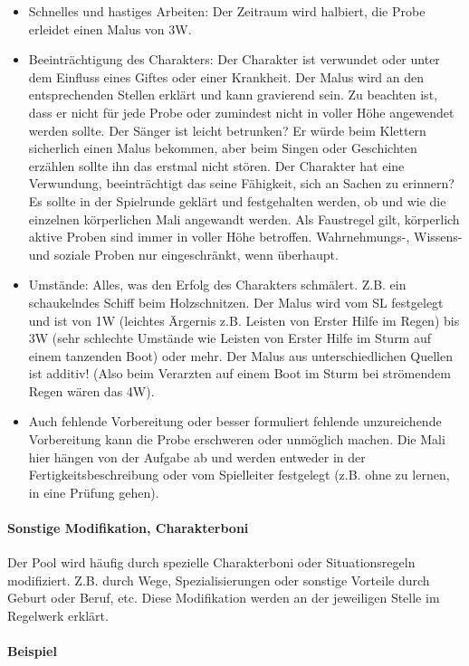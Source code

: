 \documentclass{article}
\begin{document}
\begin{itemize}
\item Schnelles und hastiges Arbeiten: Der Zeitraum wird halbiert, die Probe erleidet einen Malus von 3W.
\item Beeinträchtigung des Charakters: Der Charakter ist verwundet oder unter dem Einfluss eines Giftes oder einer Krankheit. Der Malus wird an den entsprechenden Stellen erklärt und kann gravierend sein. Zu beachten ist, dass er nicht für jede Probe oder zumindest nicht in voller Höhe angewendet werden sollte. Der Sänger ist leicht betrunken? Er würde beim Klettern sicherlich einen Malus bekommen, aber beim Singen oder Geschichten erzählen sollte ihn das erstmal nicht stören.  Der Charakter hat eine Verwundung, beeinträchtigt das seine Fähigkeit, sich an Sachen zu erinnern? Es sollte in der Spielrunde geklärt und festgehalten werden, ob und wie die einzelnen körperlichen Mali angewandt werden. Als Faustregel gilt, körperlich aktive Proben sind immer in voller Höhe betroffen. Wahrnehmungs-, Wissens- und soziale Proben nur  eingeschränkt, wenn überhaupt.
\item Umstände: Alles, was den Erfolg des Charakters schmälert. Z.B. ein schaukelndes Schiff beim Holzschnitzen. Der Malus wird vom SL festgelegt und ist von 1W (leichtes Ärgernis z.B. Leisten von Erster Hilfe im Regen) bis 3W (sehr schlechte Umstände wie Leisten von Erster Hilfe im Sturm auf einem tanzenden Boot) oder mehr. Der Malus aus unterschiedlichen Quellen ist additiv! (Also beim Verarzten auf einem Boot im Sturm bei strömendem Regen wären das 4W).
\item Auch fehlende Vorbereitung oder besser formuliert fehlende unzureichende Vorbereitung kann die Probe erschweren oder unmöglich machen. Die Mali hier hängen von der Aufgabe ab und werden entweder in der Fertigkeitsbeschreibung oder vom Spielleiter festgelegt (z.B. ohne zu lernen, in eine Prüfung gehen).
\end{itemize}

\paragraph{Sonstige Modifikation, Charakterboni}

Der Pool wird häufig durch spezielle Charakterboni oder Situationsregeln modifiziert. Z.B. durch Wege, Spezialisierungen
oder sonstige Vorteile durch Geburt oder Beruf, etc. Diese Modifikation werden an der jeweiligen Stelle im Regelwerk erklärt.

\paragraph{Beispiel}
\end{document}
